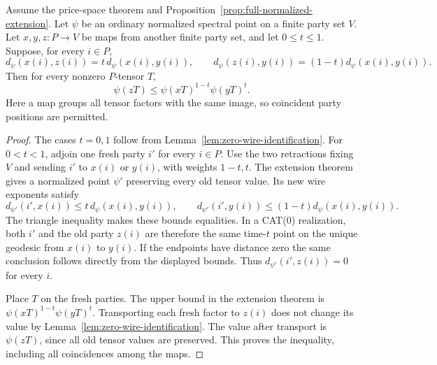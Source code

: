 \begin{proposition}
\label{prop:geodesic-tensor-convexity}
Assume the price-space theorem and
Proposition~\ref{prop:full-normalized-extension}.
Let $\psi$ be an ordinary normalized spectral point on a finite
party set $V$. Let $x,y,z:P\to V$ be maps from another finite
party set, and let $0\le t\le1$. Suppose, for every $i\in P$,
\[
 d_\psi(x(i),z(i))=t\,d_\psi(x(i),y(i)),\qquad
 d_\psi(z(i),y(i))=(1-t)d_\psi(x(i),y(i)).
\]
Then for every nonzero $P$-tensor $T$,
\begin{equation}\label{eq:geodesic-tensor-convexity}
 \psi(zT)\le\psi(xT)^{1-t}\psi(yT)^t.
\end{equation}
Here a map groups all tensor factors with the same image, so
coincident party positions are permitted.
\end{proposition}
\begin{proof}
The cases $t=0,1$ follow from Lemma~\ref{lem:zero-wire-identification}.
For $0<t<1$, adjoin one fresh party $i'$ for every $i\in P$.
Use the two retractions fixing $V$ and sending $i'$ to $x(i)$ or
$y(i)$, with weights $1-t,t$. The extension theorem gives a
normalized point $\psi'$ preserving every old tensor value.
Its new wire exponents satisfy
\[
 d_{\psi'}(i',x(i))\le t\,d_\psi(x(i),y(i)),\qquad
 d_{\psi'}(i',y(i))\le(1-t)d_\psi(x(i),y(i)).
\]
The triangle inequality makes these bounds equalities. In a
CAT(0) realization, both $i'$ and the old party $z(i)$ are
therefore the same time-$t$ point on the unique geodesic from
$x(i)$ to $y(i)$. If the endpoints have distance zero the same
conclusion follows directly from the displayed bounds.
Thus $d_{\psi'}(i',z(i))=0$ for every $i$.

Place $T$ on the fresh parties. The upper bound in the extension
theorem is $\psi(xT)^{1-t}\psi(yT)^t$. Transporting each fresh
factor to $z(i)$ does not change its value by
Lemma~\ref{lem:zero-wire-identification}. The value after transport
is $\psi(zT)$, since all old tensor values are preserved. This
proves the inequality, including all coincidences among the maps.
\end{proof}

